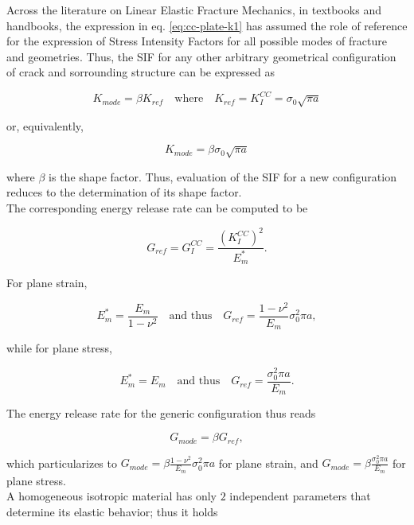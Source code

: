 \documentclass[a4paper]{jpconf}
\begin{document}
Across the literature on Linear Elastic Fracture Mechanics, in textbooks and handbooks, the expression in eq. \ref{eq:cc-plate-k1} has assumed the role of reference for the expression of Stress Intensity Factors for all possible modes of fracture and geometries. Thus, the SIF for any other arbitrary geometrical configuration of crack and sorrounding structure can be expressed as

\begin{equation}
K_{mode} = \beta K_{ref}\quad\text{where}\quad K_{ref}=K_{I}^{CC}=\sigma_{0}\sqrt{\pi a}
\end{equation}

or, equivalently,

\begin{equation}
K_{mode} = \beta\sigma_{0}\sqrt{\pi a}
\end{equation}

where $\beta$ is the shape factor. Thus, evaluation of the SIF for a new configuration reduces to the determination of its shape factor.\\
The corresponding energy release rate can be computed to be

\begin{equation}
G_{ref}=G_{I}^{CC}=\frac{\left(K_{I}^{CC}\right)^{2}}{E_{m}^{*}}.
\end{equation}

For plane strain,

\begin{equation}
E_{m}^{*}=\frac{E_{m}}{1-\nu^{2}}\quad\text{and thus}\quad G_{ref}=\frac{1-\nu^{2}}{E_{m}}\sigma_{0}^{2}\pi a,
\end{equation}

while for plane stress,

\begin{equation}
E_{m}^{*}=E_{m}\quad\text{and thus}\quad G_{ref}=\frac{\sigma_{0}^{2}\pi a}{E_{m}}.
\end{equation}

The energy release rate for the generic configuration thus reads

\begin{equation}
G_{mode}=\beta G_{ref},
\end{equation}

which particularizes to $G_{mode}=\beta\frac{1-\nu^{2}}{E_{m}}\sigma_{0}^{2}\pi a $ for plane strain, and $ G_{mode}=\beta\frac{\sigma_{0}^{2}\pi a}{E_{m}} $ for plane stress.\\
A homogeneous isotropic material has only $2$ independent parameters that determine its elastic behavior; thus it holds
\end{document}
